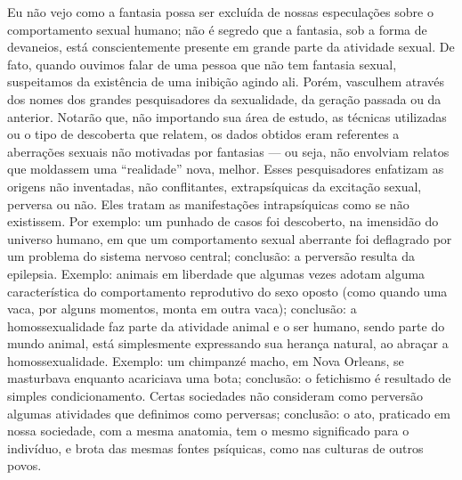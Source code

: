 Eu não vejo como a fantasia possa ser excluída de nossas
especulações sobre o comportamento sexual humano; não é segredo que a
fantasia, sob a forma de devaneios, está conscientemente presente em
grande parte da atividade sexual. De fato, quando ouvimos falar de uma
pessoa que não tem fantasia sexual, suspeitamos da existência de uma
inibição agindo ali. Porém, vasculhem através dos nomes dos grandes
pesquisadores da sexualidade, da geração passada ou da anterior.
Notarão que, não importando sua área de estudo, as técnicas utilizadas
ou o tipo de descoberta que relatem, os dados obtidos eram referentes a
aberrações sexuais não motivadas por fantasias --- ou seja, não envolviam
relatos que moldassem uma ``realidade'' nova,
melhor. Esses pesquisadores enfatizam as origens não inventadas, não
conflitantes, extrapsíquicas da excitação sexual, perversa ou não.
Eles tratam as manifestações intrapsíquicas como se não existissem. Por
exemplo: um punhado de casos foi descoberto, na imensidão do universo
humano, em que um comportamento sexual aberrante foi deflagrado por um
problema do sistema nervoso central; conclusão: a perversão resulta da
epilepsia. Exemplo: animais em liberdade que algumas vezes adotam
alguma característica do comportamento reprodutivo do sexo oposto (como
quando uma vaca, por alguns momentos, monta em outra vaca); conclusão:
a homossexualidade faz parte da atividade animal e o ser humano, sendo
parte do mundo animal, está simplesmente expressando sua herança
natural, ao abraçar a homossexualidade. Exemplo: um chimpanzé macho,\idxanim{} em
Nova Orleans, se masturbava enquanto acariciava uma bota; conclusão: o
fetichismo é resultado de simples condicionamento.\idxcond{} Certas sociedades
não consideram como perversão algumas atividades que definimos como
perversas; conclusão: o ato, praticado em nossa sociedade, com a mesma
anatomia, tem o mesmo significado para o indivíduo, e brota das mesmas
fontes psíquicas, como nas culturas\idxrela{} de outros povos.

